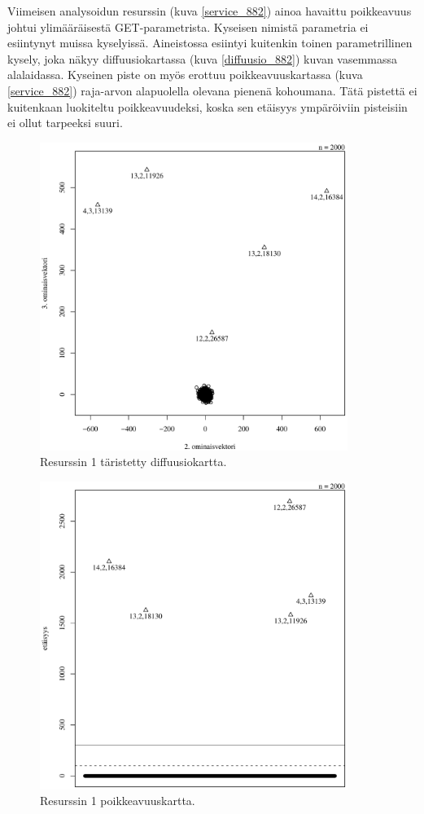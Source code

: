 Viimeisen analysoidun resurssin (kuva \ref{service_882}) ainoa
havaittu poikkeavuus johtui ylimääräisestä GET-parametrista. Kyseisen
nimistä parametria ei esiintynyt muissa kyselyissä. Aineistossa
esiintyi kuitenkin toinen parametrillinen kysely, joka näkyy
diffuusiokartassa (kuva \ref{diffuusio_882}) kuvan vasemmassa
alalaidassa. Kyseinen piste on myös erottuu poikkeavuuskartassa (kuva \ref{service_882})
raja-arvon alapuolella olevana pienenä kohoumana. Tätä pistettä ei
kuitenkaan luokiteltu poikkeavuudeksi, koska sen etäisyys ympäröiviin
pisteisiin ei ollut tarpeeksi suuri.


\begin{figure}[p]
\centering
\includegraphics[width=10cm]{pics/diffuusiokuvat/service_1.pdf}
\caption{Resurssin 1 täristetty diffuusiokartta.}
\label{diffuusio_1}
\end{figure}

\begin{figure}[p]
\centering
\includegraphics[width=10cm]{pics/tiheyskuvat/service_1.pdf}
\caption{Resurssin 1 poikkeavuuskartta.}
\label{service_1}
\end{figure}

